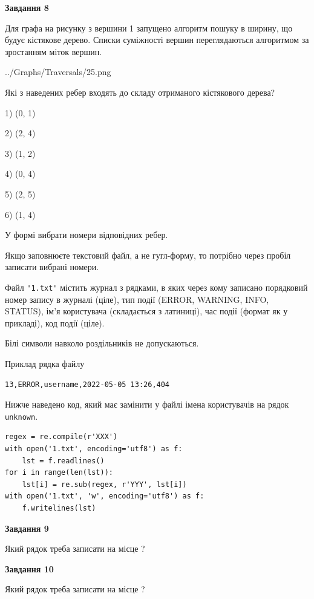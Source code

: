 \documentclass[12pt, ukrainian]{article}
\def\code#1{\Verb!#1!}
\begin{document}
{\begin {large}
{\begin {center}\textbf{Завдання 8}\end {center}}\par
Для графа на рисунку з вершини 1 запущено алгоритм пошуку в ширину, що будує кістякове дерево. Списки суміжності вершин переглядаються алгоритмом за зростанням міток вершин.\par
\begin{center}
	{../Graphs/Traversals/25.png}
\end{center}
\par Які з наведених ребер входять до складу отриманого кістякового дерева?\par
1) (0, 1)\par
2) (2, 4)\par
3) (1, 2)\par
4) (0, 4)\par
5) (2, 5)\par
6) (1, 4)\par
{\vskip 15pt} У формі вибрати номери відповідних ребер.


Якщо заповнюєте текстовий файл, а не гугл-форму, то потрібно через пробіл записа\-ти вибрані номери.\par
\newpage


Файл \code{'1.txt'} містить журнал з рядками, в яких через кому записано поряд\-ко\-вий номер запису в журналі (ціле), тип події (ERROR, WARNING, INFO, STATUS), ім'я користувача (складається з латиниці), час події (фор\-мат як у прикладі), код події (ціле).

Білі символи навколо роздільників не допускаються.

Приклад рядка файлу



\begin{verbatim}
13,ERROR,username,2022-05-05 13:26,404
\end{verbatim}


Нижче наведено код, який має замінити у файлі імена користувачів на рядок \code{unknown}.



\begin{verbatim}
regex = re.compile(r'XXX')
with open('1.txt', encoding='utf8') as f:
    lst = f.readlines()
for i in range(len(lst)):
    lst[i] = re.sub(regex, r'YYY', lst[i])
with open('1.txt', 'w', encoding='utf8') as f:
    f.writelines(lst)
\end{verbatim}




{\begin {center}\textbf{Завдання 9}\end {center}}\par
Який рядок треба записати на місце  ?\par
\vspace{5mm}


{\begin {center}\textbf{Завдання 10}\end {center}}\par
Який рядок треба записати на місце  ?\par


\newpage


\end {large}}
\end{document}
